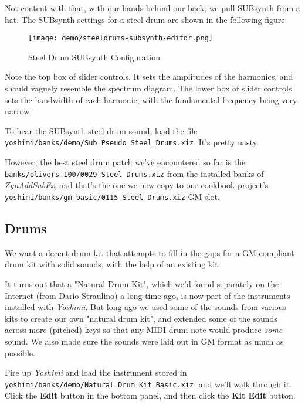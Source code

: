    Not content with that, with our hands behind our back, we pull
   SUBsynth from a hat.  The SUBsynth settings for a steel drum are shown in
   the following figure:

\begin{figure}[H]
   \centering 
   \texttt{[image: demo/steeldrums-subsynth-editor.png]}
   \caption{Steel Drum SUBsynth Configuration}
   \label{fig:cookbook_bank_steeldrum_subsynth}
\end{figure}

   Note the top box of slider controls.  It sets the amplitudes of
   the harmonics, and should vaguely resemble the spectrum diagram.
   The lower box of slider controls sets the bandwidth of each harmonic,
   with the fundamental frequency being very narrow.

   To hear the SUBsynth steel drum sound, load the file
   \texttt{yoshimi/banks/demo/Sub\_Pseudo\_Steel\_Drums.xiz}.
   It's pretty nasty.

   However, the best steel drum patch we've encountered so far is the
   \texttt{banks/olivers-100/0029-Steel Drums.xiz} from the installed banks
   of \textsl{ZynAddSubFx}, and that's the one we now copy to
   our cookbook project's 
   \texttt{yoshimi/banks/gm-basic/0115-Steel Drums.xiz} GM slot.

\subsection{Drums}
\label{subsec:cookbook_instruments_drums}

   We want a decent drum kit that attempts to fill in the gaps for a
   GM-compliant drum kit with solid sounds, with
   the help of an existing kit.

   It turns out that a "Natural Drum Kit", which we'd found separately on
   the Internet (from Dario Straulino) a long time ago, is now part of the
   instruments installed with \textsl{Yoshimi}.
   But long ago we used some of the sounds
   from various kits to create our own "natural drum kit", and extended some
   of the sounds across more (pitched) keys so that any MIDI drum note would
   produce \textsl{some} sound.  We also made sure the sounds were laid out
   in GM format as much as possible.

   Fire up \textsl{Yoshimi} and load the instrument stored in
   \texttt{yoshimi/banks/demo/Natural\_Drum\_Kit\_Basic.xiz}, and we'll walk
   through it.  Click the \textbf{Edit} button in the bottom panel, and then
   click the \textbf{Kit Edit} button.

